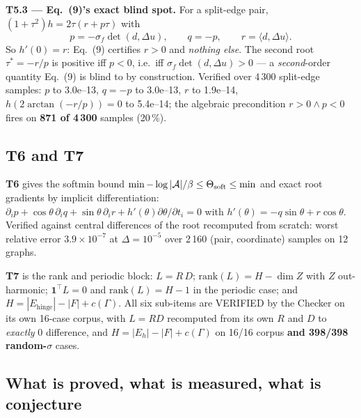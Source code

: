 \documentclass[10pt,a4paper]{article}
\begin{document}
\textbf{T5.3 --- Eq.~(9)'s exact blind spot.} For a split-edge pair,
$(1+\tau^2)h = 2\tau(r + p\tau)$ with
\[
p = -\sigma_f\det(d,\Delta u),\qquad q = -p,\qquad r = \langle d,\Delta u\rangle .
\]
So $h'(0) = r$: Eq.~(9) certifies $r>0$ and \emph{nothing else}. The second root
$\tau^* = -r/p$ is positive iff $p<0$, i.e.\ iff $\sigma_f\det(d,\Delta u)>0$ --- a
\emph{second}-order quantity Eq.~(9) is blind to by construction. Verified over 4\,300
split-edge samples: $p$ to 3.0e--13, $q=-p$ to 3.0e--13, $r$ to 1.9e--14,
$h(2\arctan(-r/p)) = 0$ to 5.4e--14; the algebraic precondition $r>0\wedge p<0$ fires on
\textbf{871 of 4\,300} samples (20\,\%).

\subsection{T6 and T7}

\textbf{T6} gives the softmin bound $\min - \log|\mathcal A|/\beta \le \Theta_{\rm soft} \le \min$
and exact root gradients by implicit differentiation:
$\partial_i p + \cos\theta\,\partial_i q + \sin\theta\,\partial_i r + h'(\theta)\partial\theta/\partial t_i = 0$
with $h'(\theta) = -q\sin\theta + r\cos\theta$. Verified against central differences of the root
recomputed from scratch: worst relative error $3.9\times10^{-7}$ at $\Delta = 10^{-5}$ over
2\,160 (pair, coordinate) samples on 12 graphs.

\textbf{T7} is the rank and periodic block: $L = R\,D$; $\mathrm{rank}(L) = H - \dim Z$ with $Z$
out-harmonic; $\mathbf 1^{\!\top}L = 0$ and $\mathrm{rank}(L) = H-1$ in the periodic case; and
$H = |E_{\mathrm{hinge}}| - |F| + c(\Gamma)$. All six sub-items are VERIFIED by the Checker on
its own 16-case corpus, with $L = RD$ recomputed from its own $R$ and $D$ to \emph{exactly} 0
difference, and $H = |E_h|-|F|+c(\Gamma)$ on 16/16 corpus \textbf{and 398/398 random-$\sigma$}
cases.

\subsection{What is proved, what is measured, what is conjecture}
\end{document}
